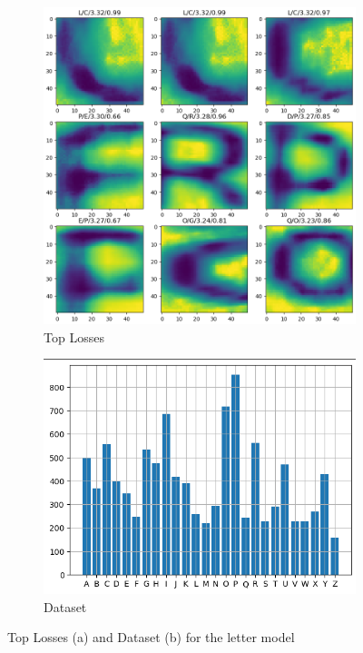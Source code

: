 \documentclass[titlepage, twocolumn]{article}
\begin{document}
\begin{figure}
    \begin{center}
        \begin{subfigure}{0.5\linewidth}
            \centering
            \includegraphics[width=\linewidth]{LetterTopLoss.png}
            \caption{Top Losses}
            \label{fig:lettersloss}
          \end{subfigure}%
          \begin{subfigure}{0.5\linewidth}
            \centering
            \includegraphics[width=\linewidth]{Letters.png}
            \caption{Dataset}
            \label{fig:letters}
          \end{subfigure}
    \end{center}
    \caption{Top Losses (a) and Dataset (b) for the letter model}
    \label{fig:letters-both}
\end{figure}
\end{document}
